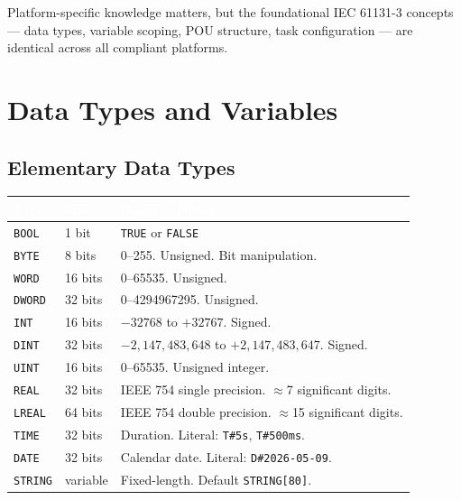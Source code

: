 \documentclass[12pt,twoside,openright]{memoir}
\begin{document}
Platform-specific knowledge matters, but the foundational IEC 61131-3 concepts --- data types, variable scoping, POU structure, task configuration --- are identical across all compliant platforms.

\chapter{Data Types and Variables}

\section{Elementary Data Types}

\begin{center}
\begin{tabular}{L{2cm} C{1.5cm} L{7cm}}
\toprule
{} \textcolor{white}{\textbf{Type}} & \textcolor{white}{\textbf{Size}} & \textcolor{white}{\textbf{Range / Notes}} \\
\midrule
{} \texttt{BOOL}   & 1 bit    & \texttt{TRUE} or \texttt{FALSE} \\
\texttt{BYTE}   & 8 bits   & 0--255. Unsigned. Bit manipulation. \\
 \texttt{WORD}   & 16 bits  & 0--65535. Unsigned. \\
\texttt{DWORD}  & 32 bits  & 0--4294967295. Unsigned. \\
 \texttt{INT}    & 16 bits  & $-32768$ to $+32767$. Signed. \\
\texttt{DINT}   & 32 bits  & $-2{,}147{,}483{,}648$ to $+2{,}147{,}483{,}647$. Signed. \\
 \texttt{UINT}   & 16 bits  & 0--65535. Unsigned integer. \\
\texttt{REAL}   & 32 bits  & IEEE 754 single precision. $\approx$7 significant digits. \\
 \texttt{LREAL}  & 64 bits  & IEEE 754 double precision. $\approx$15 significant digits. \\
\texttt{TIME}   & 32 bits  & Duration. Literal: \texttt{T\#5s}, \texttt{T\#500ms}. \\
 \texttt{DATE}   & 32 bits  & Calendar date. Literal: \texttt{D\#2026-05-09}. \\
\texttt{STRING} & variable & Fixed-length. Default \texttt{STRING[80]}. \\
\bottomrule
\end{tabular}
\end{center}
\end{document}
